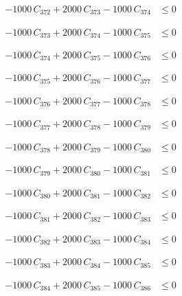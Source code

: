 \documentclass[a4paper,11pt]{article}
\begin{document}
\begin{align}
-1000\,C_{372} + 2000\,C_{373} - 1000\,C_{374} &\leq 0 \nonumber
\end{align}

\begin{align}
-1000\,C_{373} + 2000\,C_{374} - 1000\,C_{375} &\leq 0 \nonumber
\end{align}

\begin{align}
-1000\,C_{374} + 2000\,C_{375} - 1000\,C_{376} &\leq 0 \nonumber
\end{align}

\begin{align}
-1000\,C_{375} + 2000\,C_{376} - 1000\,C_{377} &\leq 0 \nonumber
\end{align}

\begin{align}
-1000\,C_{376} + 2000\,C_{377} - 1000\,C_{378} &\leq 0 \nonumber
\end{align}

\begin{align}
-1000\,C_{377} + 2000\,C_{378} - 1000\,C_{379} &\leq 0 \nonumber
\end{align}

\begin{align}
-1000\,C_{378} + 2000\,C_{379} - 1000\,C_{380} &\leq 0 \nonumber
\end{align}

\begin{align}
-1000\,C_{379} + 2000\,C_{380} - 1000\,C_{381} &\leq 0 \nonumber
\end{align}

\begin{align}
-1000\,C_{380} + 2000\,C_{381} - 1000\,C_{382} &\leq 0 \nonumber
\end{align}

\begin{align}
-1000\,C_{381} + 2000\,C_{382} - 1000\,C_{383} &\leq 0 \nonumber
\end{align}

\begin{align}
-1000\,C_{382} + 2000\,C_{383} - 1000\,C_{384} &\leq 0 \nonumber
\end{align}

\begin{align}
-1000\,C_{383} + 2000\,C_{384} - 1000\,C_{385} &\leq 0 \nonumber
\end{align}

\begin{align}
-1000\,C_{384} + 2000\,C_{385} - 1000\,C_{386} &\leq 0 \nonumber
\end{align}
\end{document}
